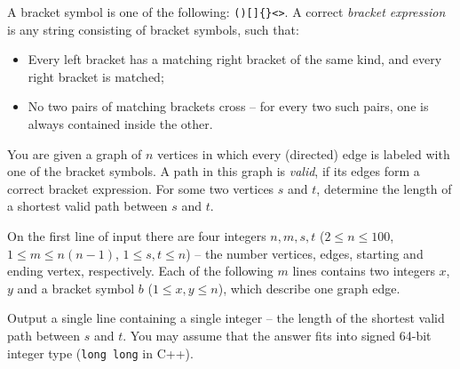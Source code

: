 










A bracket symbol is one of the following: \texttt{()[]\{\}<>}. A correct \textit{bracket expression} is any string consisting of bracket symbols, such that:
\begin{itemize}
 \item Every left bracket has a matching right bracket of the same kind, and every right bracket is matched;
 \item No two pairs of matching brackets cross -- for every two such pairs, one is always contained inside the other.
\end{itemize}

You are given a graph of $n$ vertices in which every (directed) edge is labeled with one of the bracket symbols. A path in this graph is \textit{valid}, if its edges form a correct bracket expression. For some two vertices $s$ and $t$, determine the length of a shortest valid path between $s$ and $t$.



On the first line of input there are four integers $n, m, s, t$ ($2 \leq n \leq 100$, $1 \leq m \leq n(n-1)$, $1 \leq s, t \leq n$) -- the number vertices, edges, starting and ending vertex, respectively.
Each of the following $m$ lines contains two integers $x$, $y$ and a bracket symbol $b$ ($1 \leq x, y \leq n$), which describe one graph edge.


Output a single line containing a single integer -- the length of the shortest valid path between $s$ and $t$. You may assume that the answer fits into signed 64-bit integer type (\texttt{long long} in C++).



\sampleIN

\sampleOUT
\sampleCOMMENT
\sampleEND




